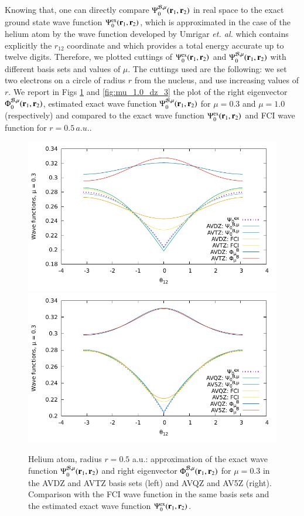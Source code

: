 \documentclass[aip,jcp,reprint,noshowkeys,superscriptaddress]{revtex4-1}
\newcommand{\br}[0]{{\bf {r}}}
\newcommand{\psiex}[0]{\Psi^{\text{ex}}_0}
\newcommand{\phimub}[0]{\Phi^{\mathcal{B},\mu}_0}
\newcommand{\psimub}[0]{\Psi^{\mathcal{B},\mu}_0}
\begin{document}
Knowing that, one can directly compare $\psimub(\br{}_1,\br{}_2) $ in real space to the exact ground state wave function $\psiex(\br{}_1,\br{}_2)$, which is approximated in the case of the helium atom by the wave function developed by Umrigar \textit{et. al.}\cite{UmrGon-PRA-94} which contains explicitly the $r_{12}$ coordinate and which provides a total energy accurate up to twelve digits. 
Therefore, we plotted cuttings of $\psiex(\br{}_1,\br{}_2)$ and  $\psimub(\br{}_1,\br{}_2) $ with different basis sets and values of $\mu$. The cuttings used are the following: we set two electrons on a circle of radius $r$ from the nucleus, and use increasing values of $r$. 
We report in Figs \ref{fig:mu_0.3_dz_3} and \ref{fig:mu_1.0_dz_3} the plot of the right eigenvector $\phimub(\br{}_1,\br{}_2)$, estimated exact wave function $\psimub(\br{}_1,\br{}_2)$ for $\mu=0.3$ and $\mu=1.0$ (respectively) and compared to the exact wave function $\psiex(\br{}_1,\br{}_2)$ and FCI wave function for $r=0.5\,a.u.$. 
\begin{figure}
 \label{fig:mu_0.3_dz_3}
        \includegraphics[width=0.45\linewidth]{plots/He//He_mu_0_3_cusp_avdz_avtz_3.pdf}
        \includegraphics[width=0.45\linewidth]{plots/He/He_mu_0_3_cusp_avqz_av5z_3.pdf}\\
        \caption{
        Helium atom, radius $r=0.5$ a.u.: approximation of the exact wave function $\psimub(\br{}_1,\br{}_2)$ and right eigenvector $\phimub(\br{}_1,\br{}_2)$ for $\mu=0.3$ in the AVDZ and AVTZ basis sets (left) and AVQZ and AV5Z (right). Comparison with the FCI wave function in the same basis sets and the estimated exact wave function $\psiex(\br{}_1,\br{}_2)$.  }
\end{figure}
\end{document}
